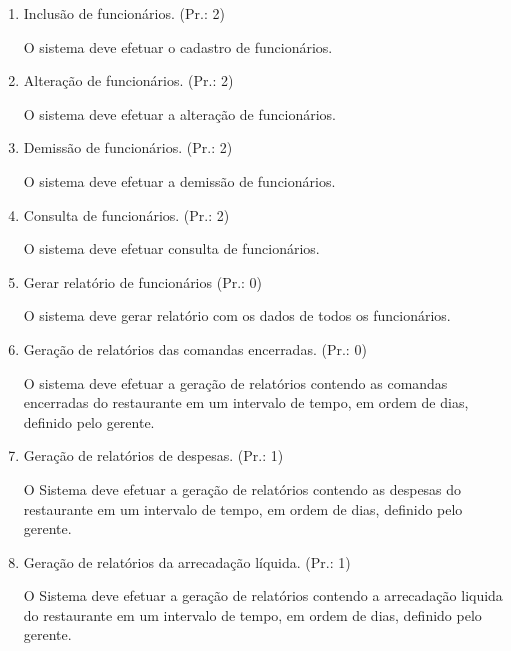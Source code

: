 \begin{enumerate}[
	label=RF\arabic{*}, 
	ref=(RF\arabic{*}),
	leftmargin=1.5em,
	itemindent=4.5em]
O sistema deve efetuar verificação da possibilidade de produção do produto a partir dos itens.\par
\item Inclusão de funcionários. (Pr.: 2)\par
O sistema deve efetuar o cadastro de funcionários.\par
\item Alteração de funcionários. (Pr.: 2)\par
O sistema deve efetuar a alteração de funcionários.\par
\item Demissão de funcionários. (Pr.: 2)\par
O sistema deve efetuar a demissão de funcionários.\par
\item Consulta de funcionários. (Pr.: 2)\par
O sistema deve efetuar consulta de funcionários.\par
\item Gerar relatório de funcionários (Pr.: 0)\par
O sistema deve gerar relatório com os dados de todos os funcionários.\par
\item Geração de relatórios das comandas encerradas. (Pr.: 0)\par
O sistema deve efetuar a geração de relatórios contendo as comandas encerradas do restaurante em um intervalo de tempo, em ordem de dias, definido pelo gerente.\par
\item Geração de relatórios de despesas. (Pr.: 1)\par
O Sistema deve efetuar a geração de relatórios contendo as despesas do restaurante em um intervalo de tempo, em ordem de dias, definido pelo gerente.\par
\item Geração de relatórios da arrecadação líquida. (Pr.: 1)\par
O Sistema deve efetuar a geração de relatórios contendo a arrecadação liquida do restaurante em um intervalo de tempo, em ordem de dias, definido pelo gerente.\par
\end{enumerate}

